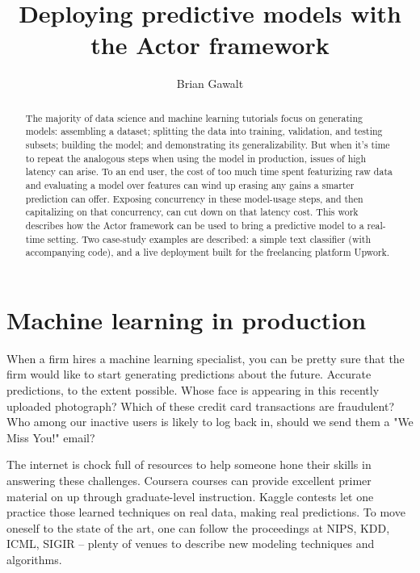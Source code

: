 \documentclass{article}
\begin{document}
\title{Deploying predictive models with the Actor framework}
\author{Brian Gawalt}

\maketitle


\begin{abstract}
The majority of data science and machine learning tutorials focus on generating models: assembling a dataset; splitting the data into training, validation, and testing subsets; building the model; and demonstrating its generalizability. But when it's time to repeat the analogous steps when using the model in production, issues of high latency can arise. To an end user, the cost of too much time spent featurizing raw data and evaluating a model over features can wind up erasing any gains a smarter prediction can offer. Exposing concurrency in these model-usage steps, and then capitalizing on that concurrency, can cut down on that latency cost. This work describes how the Actor framework can be used to bring a predictive model to a real-time setting. Two case-study examples are described: a simple text classifier (with accompanying code), and a live deployment built for the freelancing platform Upwork.
\end{abstract}

\section{Machine learning in production}
When a firm hires a machine learning specialist, you can be pretty sure that the firm would like to start generating predictions about the future. Accurate predictions, to the extent possible. Whose face is appearing in this recently uploaded photograph? Which of these credit card transactions are fraudulent? Who among our inactive users is likely to log back in, should we send them a "We Miss You!" email?

The internet is chock full of resources to help someone hone their skills in answering these challenges. Coursera courses can provide excellent primer material on up through graduate-level instruction.  Kaggle contests let one practice those learned techniques on real data, making real predictions. To move oneself to the state of the art, one can follow the proceedings at NIPS, KDD, ICML, SIGIR -- plenty of venues to describe new modeling techniques and algorithms.
\end{document}
